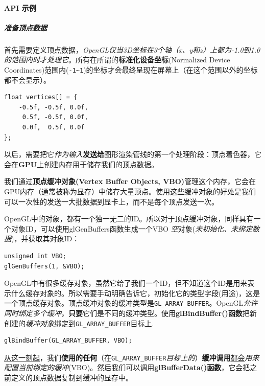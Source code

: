 \documentclass[UTF8,a4paper,12pt]{ctexbook}
\begin{document}
			\paragraph{API 示例}
			
				\subparagraph{准备顶点数据}
					首先需要定义顶点数据，\textit{OpenGL仅当3D坐标在3个轴（x、y和z）上都为-1.0到1.0的范围内时才处理它}。所有在所谓的\textbf{标准化设备坐标}(Normalized Device Coordinates)范围内(\verb|-1~1|)的坐标才会最终呈现在屏幕上（在这个范围以外的坐标都不会显示）。
					
					\begin{lstlisting}
float vertices[] = {
    -0.5f, -0.5f, 0.0f,
     0.5f, -0.5f, 0.0f,
     0.0f,  0.5f, 0.0f
};				
					\end{lstlisting}
					
					以后，需要把它\textit{作为输入}\textbf{发送给}图形渲染管线的第一个处理阶段：顶点着色器，它会在\textbf{GPU}上创建内存用于储存我们的顶点数据。
					
					我们通过\textbf{顶点缓冲对象(Vertex Buffer Objects, VBO)}管理这个内存，它会在GPU内存（通常被称为显存）中储存大量顶点。使用这些缓冲对象的好处是我们可以一次性的发送一大批数据到显卡上，而不是每个顶点发送一次。
					
					OpenGL中的对象，都有一个独一无二的ID。所以对于顶点缓冲对象，同样具有一个对象ID，可以使用glGenBuffers函数生成一个VBO \textit{空}对象(\textit{未初始化、未绑定数据})，并获取其对象ID：
					
					\begin{lstlisting}
unsigned int VBO;
glGenBuffers(1, &VBO);				
					\end{lstlisting}
					
					OpenGL中有很多缓存对象，虽然它给了我们一个ID，但不知道这个ID是用来表示什么缓存对象的。所以需要手动明确告诉它，初始化它的类型字段(用途)，这是一个顶点缓存对象。顶点缓冲对象的缓冲类型是\verb|GL_ARRAY_BUFFER|。OpenGL\textit{允许同时绑定多个缓冲}，\textbf{只要}它们是不同的缓冲类型。使用\textbf{glBindBuffer()函数}把新创建的\textit{缓冲对象}绑定到\verb|GL_ARRAY_BUFFER|目标上.
					
					\begin{lstlisting}
glBindBuffer(GL_ARRAY_BUFFER, VBO);
					\end{lstlisting}
					
					\underline{从这一刻起}，我们\textbf{使用的任何}（在\verb|GL_ARRAY_BUFFER|\textit{目标上的}）\textbf{缓冲调用}\underline{都会}\textit{用来配置当前绑定的缓冲}(VBO)。然后我们可以调用\textbf{glBufferData()函数}，它会把之前定义的顶点数据复制到缓冲的显存中。
					
\end{document}
